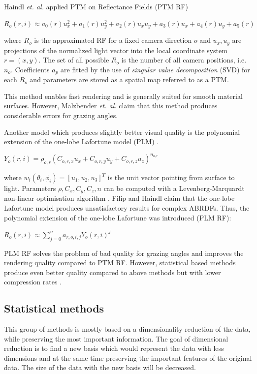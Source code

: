 Haindl  \emph{et. al.} \cite{haindl} applied PTM on Reflectance Fields (PTM RF)

{\centering$R_{o}(r,i)\approx a_{0}(r)u_{x}^2+a_{1}(r)u_{y}^2+a_{2}(r)u_{x}u_{y}+a_{3}(r)u_{x}+a_{4}(r)u_{y}+a_{5}(r)$\\}

 where $R_{o}$ is the approximated RF for a fixed camera direction $o$ and $u_{x},u_{y}$ are projections of the normalized light vector into the local coordinate system $r=(x,y)$.
 The set of all possible $R_{o}$ is the number of all camera positions, i.e. $n_{o}$. 
 Coefficients $a_{p}$ are fitted by the use of \emph{singular value decomposition} (SVD) for each $R_{o}$ and parameters are stored as a spatial map referred to as a PTM.
 
  This method enables fast rendering and is generally suited for smooth material surfaces.
  However, Malzbender  \emph{et. al.} \cite{PTM} claim that this method produces considerable errors for grazing angles. 

 
 Another model which produces slightly better visual quality is the polynomial extension of the one-lobe Lafortune model (PLM) \cite{haindl}.


{\centering$Y_{o} (r,i) = \rho_{o,r}(C_{o,r,x}u_{x}+C_{o,r,y}u_{y}+C_{o,r,z}u_{z})_{ }^{n_{o,r}}$\\}

where $w_{i}(\theta_{i}, \phi_{i})=[u_{1},u_{2},u_{3}]^{T}$ is the unit vector pointing from surface to light.
Parameters $\rho,C_{x},C_{y},C_{z},n$ can be computed with a Levenberg-Marquardt non-linear optimisation algorithm \cite{plm}. 
 Filip and Haindl \cite{plm} claim that the one-lobe Lafortune model produces unsatisfactory results for complex ABRDFs.
 Thus, the polynomial extension of the one-lobe Lafortune was introduced (PLM RF):

{\centering$R_{o}(r,i)\approx  \sum_{j=0}^{n} a_{r,o,i,j}Y_{o}(r,i)^j$\\}



PLM RF solves the problem of bad quality for grazing angles and improves the rendering quality compared to PTM RF.
However, statistical based methods produce even better quality compared to above methods but with lower compression rates \cite{haindl}.



  \subsection{Statistical methods}
\label{section:stat_methods}
This group of methods is mostly based on a dimensionality reduction of the data, while preserving the most important information.
The goal of dimensional reduction is to find a new basis which would represent the data with less dimensions and at the same time preserving the important features of the original data.
 The size of the data with the new basis will be decreased.

